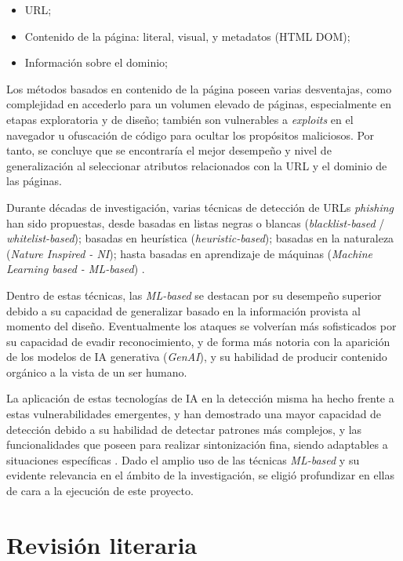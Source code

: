\begin{itemize}
    \item URL;
    \item Contenido de la página: literal, visual, y metadatos (HTML DOM);
    \item Información sobre el dominio;
\end{itemize}

Los métodos basados en contenido de la página poseen varias desventajas, como complejidad en accederlo para un volumen elevado de páginas, especialmente en etapas exploratoria y de diseño; también son vulnerables a \textit{exploits} en el navegador \cite{kim2022} u ofuscación de código \cite{abdelnabi2020} para ocultar los propósitos maliciosos. Por tanto, se concluye que se encontraría el mejor desempeño y nivel de generalización al seleccionar atributos relacionados con la URL y el dominio de las páginas.

Durante décadas de investigación, varias técnicas de detección de URLs \textit{phishing} han sido propuestas, desde basadas en listas negras o blancas (\textit{blacklist-based} / \textit{whitelist-based}); basadas en heurística (\textit{heuristic-based}); basadas en la naturaleza (\textit{Nature Inspired - NI}); hasta basadas en aprendizaje de máquinas (\textit{Machine Learning based - ML-based}) \cite{akinyelu2019}.

Dentro de estas técnicas, las \textit{ML-based} se destacan por su desempeño superior debido a su capacidad de generalizar basado en la información provista al momento del diseño. Eventualmente los ataques se volverían más sofisticados por su capacidad de evadir reconocimiento, y de forma más notoria con la aparición de los modelos de IA generativa (\textit{GenAI}), y su habilidad de producir contenido orgánico a la vista de un ser humano.

La aplicación de estas tecnologías de IA en la detección misma ha hecho frente a estas vulnerabilidades emergentes, y han demostrado una mayor capacidad de detección debido a su habilidad de detectar patrones más complejos, y las funcionalidades que poseen para realizar sintonización fina, siendo adaptables a situaciones específicas \cite{patel2024,yigit2024}. Dado el amplio uso de las técnicas \textit{ML-based} y su evidente relevancia en el ámbito de la investigación, se eligió profundizar en ellas de cara a la ejecución de este proyecto.

\section{Revisión literaria}

